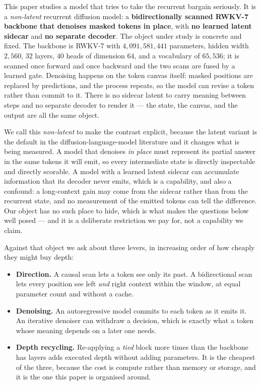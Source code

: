 \documentclass[11pt]{article}
\begin{document}
This paper studies a model that tries to take the recurrent bargain seriously. It is a
\emph{non-latent} recurrent diffusion model: a \textbf{bidirectionally scanned RWKV-7
backbone that denoises masked tokens in place}, with \textbf{no learned latent sidecar} and
\textbf{no separate decoder}. The object under study is concrete and fixed. The backbone is
RWKV-7 with $4{,}091{,}581{,}441$ parameters, hidden width $2{,}560$, $32$ layers, $40$
heads of dimension $64$, and a vocabulary of $65{,}536$; it is scanned once forward and once
backward and the two scans are fused by a learned gate. Denoising happens on the token
canvas itself: masked positions are replaced by predictions, and the process repeats,
so the model can revise a token rather than commit to it. There is no sidecar latent to
carry meaning between steps and no separate decoder to render it --- the state, the canvas,
and the output are all the same object.

We call this \emph{non-latent} to make the contrast explicit, because the latent variant is
the default in the diffusion-language-model literature and it changes what is being
measured. A model that denoises \emph{in place} must represent its partial answer in the
same tokens it will emit, so every intermediate state is directly inspectable and directly
scorable. A model with a learned latent sidecar can accumulate information that its decoder
never emits, which is a capability, and also a confound: a long-context gain may come from
the sidecar rather than from the recurrent state, and no measurement of the emitted tokens
can tell the difference. Our object has no such place to hide, which is what makes the
questions below well posed --- and it is a deliberate restriction we pay for, not a
capability we claim.

Against that object we ask about three levers, in increasing order of how cheaply they
might buy depth:

\begin{itemize}
  \item \textbf{Direction.} A causal scan lets a token see only its past. A bidirectional
  scan lets every position see left \emph{and} right context within the window, at equal
  parameter count and without a cache.
  \item \textbf{Denoising.} An autoregressive model commits to each token as it emits it.
  An iterative denoiser can withdraw a decision, which is exactly what a token whose
  meaning depends on a later one needs.
  \item \textbf{Depth recycling.} Re-applying a \emph{tied} block more times than the
  backbone has layers adds executed depth without adding parameters. It is the cheapest of
  the three, because the cost is compute rather than memory or storage, and it is the one
  this paper is organised around.
\end{itemize}
\end{document}
